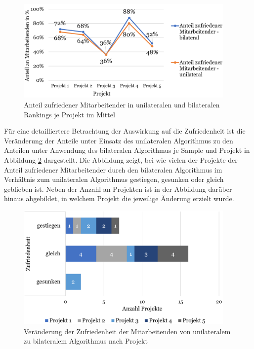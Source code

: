 \begin{figure}[H]
    \centering
	\includegraphics[width=0.95\textwidth]{gfx/verhaeltnis-z-durchschnitt-projekte.png}
	\caption[Anteil zufriedener Mitarbeitender in unilateralen und bilateralen Rankings je Projekt im Mittel]{Anteil zufriedener Mitarbeitender in unilateralen und bilateralen Rankings je Projekt im Mittel}
	\label{fig:ergebnisse:abb8}
\end{figure}

Für eine detailliertere Betrachtung der Auswirkung auf die Zufriedenheit ist die Veränderung der Anteile unter Einsatz des unilateralen Algorithmus zu den Anteilen unter Anwendung des bilateralen Algorithmus je Sample und Projekt in Abbildung \ref{fig:ergebnisse:abb9} dargestellt.
Die Abbildung zeigt, bei wie vielen der Projekte der Anteil zufriedener Mitarbeitender durch den bilateralen Algorithmus im Verhältnis zum unilateralen Algorithmus gestiegen, gesunken oder gleich geblieben ist.
Neben der Anzahl an Projekten ist in der Abbildung darüber hinaus abgebildet, in welchem Projekt die jeweilige Änderung erzielt wurde.

\begin{figure}[H]
    \centering
	\includegraphics[width=0.95\textwidth]{gfx/verhaeltnis-z-projekte.png}
	\caption[Veränderung der Zufriedenheit der Mitarbeitenden von unilateralem zu bilateralem Algorithmus nach Projekt]{Veränderung der Zufriedenheit der Mitarbeitenden von unilateralem zu bilateralem Algorithmus nach Projekt}
	\label{fig:ergebnisse:abb9}
\end{figure}

